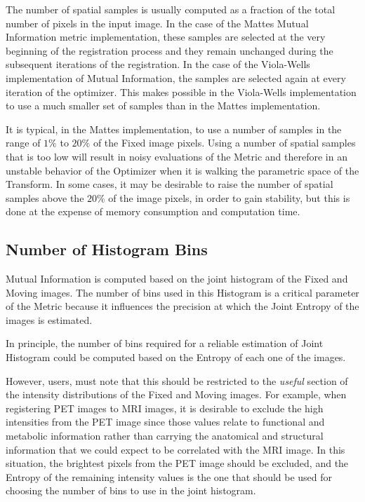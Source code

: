 \documentclass{InsightArticle}
\begin{document}
The number of spatial samples is usually computed as a fraction of the total
number of pixels in the input image.  In the case of the Mattes Mutual
Information metric implementation, these samples are selected at the very
beginning of the registration process and they remain unchanged during the
subsequent iterations of the registration. In the case of the Viola-Wells
implementation of Mutual Information, the samples are selected again at every
iteration of the optimizer. This makes possible in the Viola-Wells
implementation to use a much smaller set of samples than in the Mattes
implementation.

It is typical, in the Mattes implementation, to use a number of samples in the
range of $1\%$ to $20\%$ of the Fixed image pixels. Using a number of spatial
samples that is too low will result in noisy evaluations of the Metric and
therefore in an unstable behavior of the Optimizer when it is walking the
parametric space of the Transform. In some cases, it may be desirable to raise
the number of spatial samples above the $20\%$ of the image pixels, in order to
gain stability, but this is done at the expense of memory consumption and
computation time.

\subsection{Number of Histogram Bins}

Mutual Information is computed based on the joint histogram of the Fixed and
Moving images. The number of bins used in this Histogram is a critical
parameter of the Metric because it influences the precision at which the Joint
Entropy of the images is estimated.

In principle, the number of bins required for a reliable estimation of Joint 
Histogram could be computed based on the Entropy of each one of the images.

However, users, must note that this should be restricted to the \emph{useful}
section of the intensity distributions of the Fixed and Moving images. For
example, when registering PET images to MRI images, it is desirable to exclude
the high intensities from the PET image since those values relate to functional
and metabolic information rather than carrying the anatomical and structural
information that we could expect to be correlated with the MRI image. In this
situation, the brightest pixels from the PET image should be excluded, and the
Entropy of the remaining intensity values is the one that should be used for
choosing the number of bins to use in the joint histogram.
\end{document}
